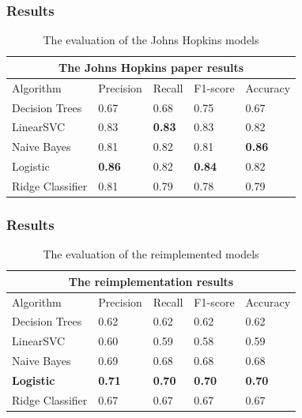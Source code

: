 \documentclass{beamer}
\begin{document}
\begin{frame}
	\frametitle{Results}	
	\begin{table}[h!]
		\centering
		\begin{tabular}{|p{3cm}|p{1.5cm}|p{1.5cm}|p{1.5cm}|p{1.5cm}|} 
			\hline
			\multicolumn{5}{|c|}{The Johns Hopkins paper results}\\
			\hline
			Algorithm & Precision & Recall & F1-score & Accuracy \\ [0.5ex] 
			\hline
			Decision Trees & 0.67 & 0.68 & 0.75 & 0.67 \\ 
			LinearSVC & 0.83 & \textbf{0.83} & 0.83 & 0.82 \\ 
			Naive Bayes & 0.81 & 0.82 & 0.81 & \textbf{0.86} \\ 
			Logistic &  \textbf{0.86} & 0.82 &  \textbf{0.84} & 0.82 \\ 
			Ridge Classifier & 0.81 & 0.79 & 0.78 & 0.79 \\ 
			\hline
		\end{tabular}
		\caption{The evaluation of the Johns Hopkins models}
		\label{Table:1}
	\end{table}
\end{frame}

\begin{frame}
	\frametitle{Results}	
	\begin{table}[h!]
		\centering
		\begin{tabular}{|p{3cm}|p{1.5cm}|p{1.5cm}|p{1.5cm}|p{1.5cm}|} 
			\hline
			\multicolumn{5}{|c|}{The reimplementation results}\\
			\hline
			Algorithm & Precision & Recall & F1-score & Accuracy \\ [0.5ex] 
			\hline
			Decision Trees & 0.62 & 0.62 & 0.62 & 0.62 \\ 
			LinearSVC & 0.60 & 0.59 & 0.58 & 0.59 \\ 
			Naive Bayes & 0.69 & 0.68 & 0.68 & 0.68 \\ 
			\textbf{Logistic} &  \textbf{0.71} & \textbf{0.70} &  \textbf{0.70} & \textbf{0.70} \\ 
			Ridge Classifier & 0.67 & 0.67 & 0.67 & 0.67 \\ 
			\hline
		\end{tabular}
		\caption{The evaluation of the reimplemented models}
		\label{Table:1}
	\end{table}
	
\end{frame}

\end{document}
